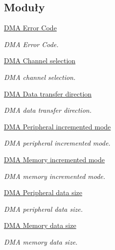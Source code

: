 \subsection*{Moduły}
\begin{DoxyCompactItemize}
\item 
\hyperlink{group___d_m_a___error___code}{D\+M\+A Error Code}
\begin{DoxyCompactList}\small\item\em D\+MA Error Code. \end{DoxyCompactList}\item 
\hyperlink{group___d_m_a___channel__selection}{D\+M\+A Channel selection}
\begin{DoxyCompactList}\small\item\em D\+MA channel selection. \end{DoxyCompactList}\item 
\hyperlink{group___d_m_a___data__transfer__direction}{D\+M\+A Data transfer direction}
\begin{DoxyCompactList}\small\item\em D\+MA data transfer direction. \end{DoxyCompactList}\item 
\hyperlink{group___d_m_a___peripheral__incremented__mode}{D\+M\+A Peripheral incremented mode}
\begin{DoxyCompactList}\small\item\em D\+MA peripheral incremented mode. \end{DoxyCompactList}\item 
\hyperlink{group___d_m_a___memory__incremented__mode}{D\+M\+A Memory incremented mode}
\begin{DoxyCompactList}\small\item\em D\+MA memory incremented mode. \end{DoxyCompactList}\item 
\hyperlink{group___d_m_a___peripheral__data__size}{D\+M\+A Peripheral data size}
\begin{DoxyCompactList}\small\item\em D\+MA peripheral data size. \end{DoxyCompactList}\item 
\hyperlink{group___d_m_a___memory__data__size}{D\+M\+A Memory data size}
\begin{DoxyCompactList}\small\item\em D\+MA memory data size. \end{DoxyCompactList}\item 

\end{DoxyCompactItemize}
